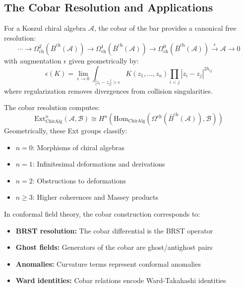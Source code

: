 \subsection{The Cobar Resolution and Applications}

\begin{theorem}\label{thm:cobar-resolution}
For a Koszul chiral algebra $\mathcal{A}$, the cobar of the bar provides a canonical free resolution:
\[
\cdots \to \Omega^2_{\text{ch}}(\bar{B}^{\text{ch}}(\mathcal{A})) \to \Omega^1_{\text{ch}}(\bar{B}^{\text{ch}}(\mathcal{A})) \to \Omega^0_{\text{ch}}(\bar{B}^{\text{ch}}(\mathcal{A})) \xrightarrow{\epsilon} \mathcal{A} \to 0
\]
with augmentation $\epsilon$ given geometrically by:
\[
\epsilon(K) = \lim_{\epsilon \to 0} \int_{|z_i - z_j| > \epsilon} K(z_1, \ldots, z_n) \prod_{i < j} |z_i - z_j|^{2h_{ij}}
\]
where regularization removes divergences from collision singularities.
\end{theorem}

\begin{remark}
The cobar resolution computes:
\[
\text{Ext}^n_{\text{ChirAlg}}(\mathcal{A}, \mathcal{B}) \cong H^n(\text{Hom}_{\text{ChirAlg}}(\Omega^{\text{ch}}(\bar{B}^{\text{ch}}(\mathcal{A})), \mathcal{B}))
\]
Geometrically, these Ext groups classify:
\begin{itemize}
\item $n = 0$: Morphisms of chiral algebras
\item $n = 1$: Infinitesimal deformations and derivations
\item $n = 2$: Obstructions to deformations
\item $n \geq 3$: Higher coherences and Massey products
\end{itemize}
\end{remark}

\begin{remark}
In conformal field theory, the cobar construction corresponds to:
\begin{itemize}
\item \textbf{BRST resolution:} The cobar differential is the BRST operator
\item \textbf{Ghost fields:} Generators of the cobar are ghost/antighost pairs
\item \textbf{Anomalies:} Curvature terms represent conformal anomalies
\item \textbf{Ward identities:} Cobar relations encode Ward-Takahashi identities
\end{itemize}
\end{remark}

